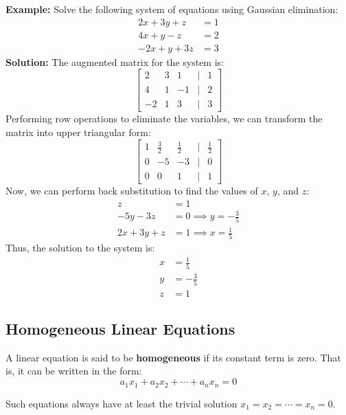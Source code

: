 \textbf{Example:} Solve the following system of equations using Gaussian elimination:
\begin{align*}
	2x + 3y + z  & = 1 \\
	4x + y - z   & = 2 \\
	-2x + y + 3z & = 3
\end{align*}
\textbf{Solution:} The augmented matrix for the system is:
\begin{equation*}
	\begin{bmatrix}
		2  & 3 & 1  & | & 1 \\
		4  & 1 & -1 & | & 2 \\
		-2 & 1 & 3  & | & 3
	\end{bmatrix}
\end{equation*}
Performing row operations to eliminate the variables, we can transform the matrix into upper triangular form:
\begin{equation*}
	\begin{bmatrix}
		1 & \frac{3}{2} & \frac{1}{2} & | & \frac{1}{2} \\
		0 & -5          & -3          & | & 0           \\
		0 & 0           & 1           & | & 1
	\end{bmatrix}
\end{equation*}
Now, we can perform back substitution to find the values of \(x\), \(y\), and \(z\):
\begin{align*}
	z           & = 1                           \\
	-5y - 3z    & = 0 \implies y = -\frac{3}{5} \\
	2x + 3y + z & = 1 \implies x = \frac{1}{5}
\end{align*}
Thus, the solution to the system is:
\begin{align*}
	x & = \frac{1}{5}  \\
	y & = -\frac{3}{5} \\
	z & = 1
\end{align*}

\subsection{Homogeneous Linear Equations}

A linear equation is said to be \textbf{homogeneous} if its constant term is zero. That is, it can be written in the form:
\[
	a_1x_1 + a_2x_2 + \cdots + a_nx_n = 0
\]

Such equations always have at least the trivial solution \(x_1 = x_2 = \cdots = x_n = 0\).

